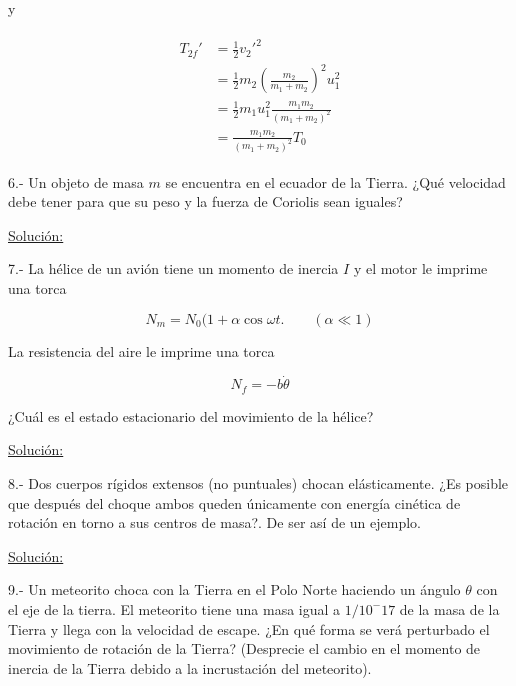 \documentclass[a4paper,10pt]{article}
\begin{document}
y

\begin{align}
\begin{split} 
%
 T_{2f}' &= \frac{1}{2} v_2'^2 \\
%
	 &= \frac{1}{2}m_2\left(\frac{m_2}{m_1+m_2}\right)^2 u_1^2 \\
%
	 &= \frac{1}{2}m_1 u_1^2 \frac{m_1 m_2}{(m_1+m_2)^2} \\
%
	 &= \frac{m_1 m_2}{(m_1+m_2)^2} T_0
%
\label{eq:erergCineFinalm2CM}
\end{split}
\end{align}







6.- Un objeto de masa $m$ se encuentra en el ecuador de la Tierra. ¿Qué velocidad debe 
tener para que su peso y la fuerza de Coriolis sean iguales?

\vspace{.3cm}

\underline{Solución:}

\vspace{.3cm}

7.- La hélice de un avión tiene un momento de inercia $I$ y el motor le imprime una torca 

$$N_m = N_0 (1+\alpha \cos{\omega t}. \qquad (\alpha \ll 1)$$

La resistencia del aire le imprime una torca

$$N_f = -b\dot{\theta}$$

¿Cuál es el estado estacionario del movimiento de la hélice?

\vspace{.3cm}

\underline{Solución:}

\vspace{.3cm}

8.- Dos cuerpos rígidos extensos (no puntuales) chocan elásticamente. ¿Es posible que 
después del choque ambos queden únicamente con energía cinética de rotación en torno 
a sus centros de masa?. De ser así de un ejemplo.
\vspace{.3cm}

\underline{Solución:}

\vspace{.3cm}
9.- Un meteorito choca con la Tierra en el Polo Norte haciendo un ángulo $\theta$ con
el eje de la tierra. El meteorito tiene una masa igual a $1/10^-17$ de la masa de la 
Tierra y llega con la velocidad de escape. ¿En qué forma se verá perturbado el movimiento
de rotación de la Tierra? (Desprecie el cambio en el momento de inercia de la Tierra
debido a la incrustación del meteorito).
\vspace{.3cm}
\end{document}
